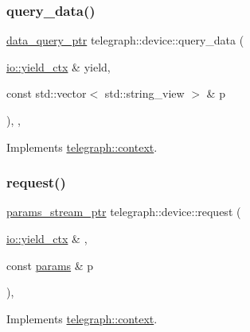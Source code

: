 \subsubsection{\texorpdfstring{query\+\_\+data()}{query\_data()}\hspace{0.1cm}{\footnotesize\ttfamily [2/2]}}
{\footnotesize\ttfamily \hyperlink{namespacetelegraph_a6ffe775ac48dca2a4013b53d692199c8}{data\+\_\+query\+\_\+ptr} telegraph\+::device\+::query\+\_\+data (\begin{DoxyParamCaption}\item[{\hyperlink{structboost_1_1asio_1_1yield__ctx}{io\+::yield\+\_\+ctx} \&}]{yield,  }\item[{const std\+::vector$<$ std\+::string\+\_\+view $>$ \&}]{p }\end{DoxyParamCaption})\hspace{0.3cm}{\ttfamily [inline]}, {\ttfamily [override]}, {\ttfamily [virtual]}}



Implements \hyperlink{classtelegraph_1_1context_a34793623d2a2def580ad0b8710c74c6d}{telegraph\+::context}.

\mbox{\label{classtelegraph_1_1device_a9e5042e4640035b28dd9de780d7326df}} 
\subsubsection{\texorpdfstring{request()}{request()}}
{\footnotesize\ttfamily \hyperlink{namespacetelegraph_ad071241508ea0f86c7de0686016f9ca9}{params\+\_\+stream\+\_\+ptr} telegraph\+::device\+::request (\begin{DoxyParamCaption}\item[{\hyperlink{structboost_1_1asio_1_1yield__ctx}{io\+::yield\+\_\+ctx} \&}]{,  }\item[{const \hyperlink{classtelegraph_1_1params}{params} \&}]{p }\end{DoxyParamCaption})\hspace{0.3cm}{\ttfamily [inline]}, {\ttfamily [virtual]}}



Implements \hyperlink{classtelegraph_1_1context_a6765d7fa22fe99b9a6723c511396b781}{telegraph\+::context}.

\mbox{\label{classtelegraph_1_1device_ab0117f6015f904afae72d6ab90c8ad95}} 
